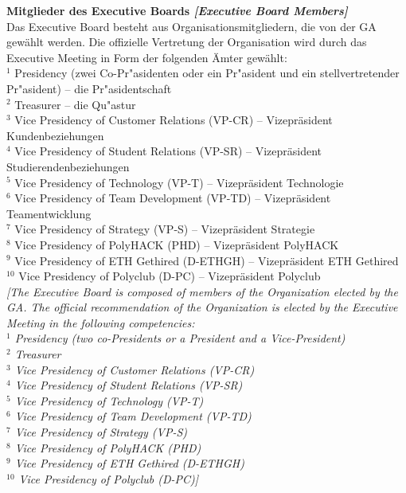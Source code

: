 \documentclass[10pt]{article}
\newcounter{qcounter}
\begin{document}
\begin{list}{{\bf Artikel :~}}{}
\item {\bf Mitglieder des Executive Boards {\it [Executive Board Members]}}\\
Das Executive Board besteht aus Organisationsmitgliedern, die von der GA gewählt werden. Die offizielle Vertretung der Organisation wird durch das Executive Meeting in Form der folgenden Ämter gewählt:\\
$^{1}$ Presidency (zwei Co-Pr"asidenten oder ein Pr"asident und ein stellvertretender Pr"asident) – die Pr"asidentschaft\\
$^{2}$ Treasurer – die Qu"astur\\
$^{3}$ Vice Presidency of Customer Relations (VP-CR) – Vizepräsident Kundenbeziehungen\\
$^{4}$ Vice Presidency of Student Relations (VP-SR) – Vizepräsident Studierendenbeziehungen\\
$^{5}$ Vice Presidency of Technology (VP-T) – Vizepräsident Technologie\\
$^{6}$ Vice Presidency of Team Development (VP-TD) – Vizepräsident Teamentwicklung\\
$^{7}$ Vice Presidency of Strategy (VP-S) – Vizepräsident Strategie\\
$^{8}$ Vice Presidency of PolyHACK (PHD) – Vizepräsident PolyHACK\\
$^{9}$ Vice Presidency of ETH Gethired (D-ETHGH) – Vizepräsident ETH Gethired\\
$^{10}$ Vice Presidency of Polyclub (D-PC) – Vizepräsident Polyclub\\
{\it[The Executive Board is composed of members of the Organization elected by the GA. The official recommendation of the Organization is elected by the Executive Meeting in the following competencies:\\
$^{1}$ Presidency (two co-Presidents or a President and a Vice-President)\\
$^{2}$ Treasurer\\
$^{3}$ Vice Presidency of Customer Relations (VP-CR)\\
$^{4}$ Vice Presidency of Student Relations (VP-SR)\\
$^{5}$ Vice Presidency of Technology (VP-T)\\
$^{6}$ Vice Presidency of Team Development (VP-TD)\\
$^{7}$ Vice Presidency of Strategy (VP-S)\\
$^{8}$ Vice Presidency of PolyHACK (PHD)\\
$^{9}$ Vice Presidency of ETH Gethired (D-ETHGH)\\
$^{10}$ Vice Presidency of Polyclub (D-PC)]}


\end{list}
\end{document}
